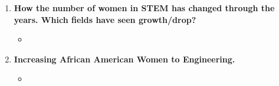 \documentclass[12pt,a4paper]{article}
\begin{document}
\begin{enumerate}
\begin{itemize}
      \href{https://web.archive.org/web/20170312212947/http:/www.doublexscience.org/the-finkbeiner-test/}{} \& \href{https://publiceditor.blogs.nytimes.com/2013/04/01/gender-questions-arise-in-obituary-of-rocket-scientist-and-her-beef-stroganoff/}{}
    \end{itemize}
    \item {} \textbf{How the number of women in STEM has changed through the years. Which fields have seen growth/drop?}
    \begin{itemize}
      \item 
    \end{itemize}
    \item {} \textbf{Increasing African American Women to Engineering.}
    \begin{itemize}
      \item \href{https://www.nsbe.org/getattachment/News-Media/NSBE-News/ignored-potential/NSBE_IgnoredPotential_Whitepaper_TXT-FINAL.PDF.aspx}{} \imp{\&} 
    \end{itemize}
  \end{enumerate}
\end{document}
